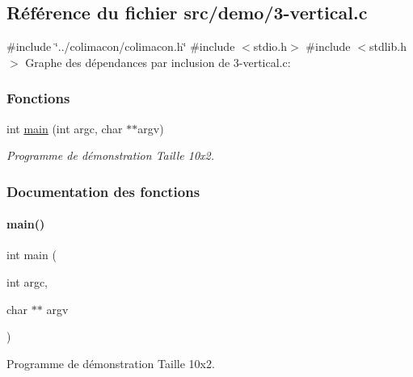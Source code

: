 \hypertarget{3-vertical_8c}{}\subsection{Référence du fichier src/demo/3-\/vertical.c}
\label{3-vertical_8c}
{\ttfamily \#include \char`\"{}../colimacon/colimacon.\+h\char`\"{}}\newline
{\ttfamily \#include $<$stdio.\+h$>$}\newline
{\ttfamily \#include $<$stdlib.\+h$>$}\newline
Graphe des dépendances par inclusion de 3-\/vertical.c\+:
\subsubsection*{Fonctions}
\begin{DoxyCompactItemize}
\item 
int \hyperlink{3-vertical_8c_a3c04138a5bfe5d72780bb7e82a18e627}{main} (int argc, char $\ast$$\ast$argv)
\begin{DoxyCompactList}\small\item\em Programme de démonstration Taille 10x2. \end{DoxyCompactList}\end{DoxyCompactItemize}


\subsubsection{Documentation des fonctions}
\mbox{\label{3-vertical_8c_a3c04138a5bfe5d72780bb7e82a18e627}} 
\paragraph{\texorpdfstring{main()}{main()}}
{\footnotesize\ttfamily int main (\begin{DoxyParamCaption}\item[{int}]{argc,  }\item[{char $\ast$$\ast$}]{argv }\end{DoxyParamCaption})}



Programme de démonstration Taille 10x2. 

